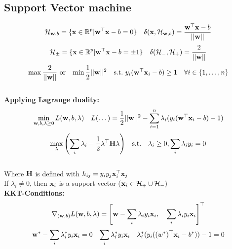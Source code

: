 \begin{mdframed}[style=eqbox]
\subsection{Support Vector machine}
\vspace*{-6pt}\begin{align*}
  \mathcal{H}_{\mathbf{w}, b} = \{ \mathbf{x} \in \mathbb{R}^p \vert \mathbf{w}^\top \mathbf{x} - b = 0 \} && \delta(\mathbf{x}, \mathcal{H}_{\mathbf{w}, b}) = \frac{\mathbf{w}^\top \mathbf{x} - b}{\vert \vert \mathbf{w} \vert\vert}
\end{align*}
\vspace*{-16pt}\begin{align*}
  \mathcal{H}_{\pm} = \{ \mathbf{x} \in \mathbb{R}^p \vert \mathbf{w}^\top \mathbf{x} - b = \pm 1 \} && \delta(\mathcal{H}_- , \mathcal H_+ ) = \frac{2}{\vert \vert \mathbf{w} \vert\vert}
\end{align*}
\vspace*{-16pt}\begin{align*}
  \max \frac{2}{\vert \vert \mathbf{w} \vert\vert} &\mathrm{~or}& \min \frac{1}{2} \vert \vert \mathbf{w} \vert\vert^2 && \mathrm{s.t.~} y_i( \mathbf{w}^\top \mathbf{x}_i - b) \geq 1 \quad \forall i \in \{1, \ldots, n\}
\end{align*}\vspace*{-12pt}\\
\textbf{Applying Lagrange duality:}
\vspace*{-8pt}\begin{align*}
\min_{\mathbf{w}, b, \lambda \geq 0} L(\mathbf{w}, b, \mathbf{\lambda}) && L(\dots) = \frac{1}{2}\vert \vert \mathbf{w} \vert\vert^2 - \sum_{i=1}^{n} \lambda_i (y_i(\mathbf{w}^\top \mathbf{x}_i - b) - 1)
\end{align*}
\vspace*{-16pt}\begin{align*}
\max_{\mathbf{\lambda}} \left(\sum_i \lambda_i - \frac{1}{2} \mathbf{\lambda}^\top \mathbf{H} \mathbf{\lambda}\right) && \text{s.t.} \quad \mathbf{\lambda}_i \geq 0, \sum_i \lambda_i y_i = 0
\end{align*}\vspace*{-10pt}\\
\small{Where $\mathbf{H}$ is defined with $h_{ij} = y_i y_j \mathbf{x}^\top_i \mathbf{x}_j$}\\
\small{If $\lambda_i \neq 0$, then $\mathbf{x}_i$ is a support vector ($\mathbf{x}_i \in \mathcal H_+ \cup \mathcal H_-)$}\\[0.35em]
\textbf{KKT-Conditions:}
\vspace*{-8pt}\begin{align*}
  \nabla_{(\mathbf{w}, b)} L(\mathbf{w}, b, \mathbf{\lambda}) = \left[\mathbf{w} - \sum_i \lambda_i y_i \mathbf{x}_i,\quad \sum_i \lambda_i y_i \mathbf{x}_i \right]^\top
\end{align*}
\vspace*{-10pt}\begin{align*}
  \mathbf{w}^* - \sum_i \lambda_i^* y_i \mathbf{x}_i = 0 && \sum_i \lambda^*_i y_i \mathbf{x}_i && \lambda^*_i(y_i( \mathbf{(}w^*)^\top \mathbf{x}_i - b^*)) - 1 = 0
\end{align*}

\end{mdframed}
